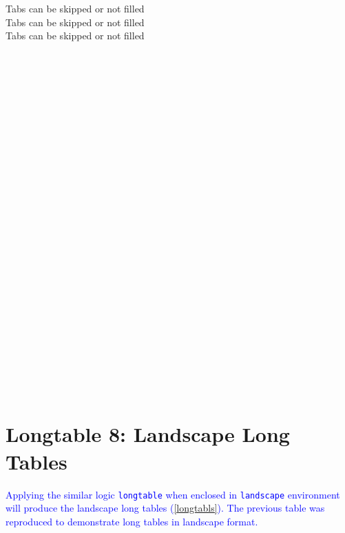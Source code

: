 \documentclass[phd,showgrids]{ndsu-thesis-2022}
\newcommand\italk[1]{\textcolor{blue}{#1}}  %
\begin{document}
\begin{tabbing}
\>Tabs can be skipped or not filled\\ 
\>\>Tabs can be skipped or not filled\\ 
\>\>\>Tabs can be skipped or not filled\\ 
    \\
    \\
    \\
    \\
    \\
    \\
    \\
    \\
    \\
    \\
    \\
    \\
    \\
    \\
    \\
    \\
    \\
    \\
    \\
    \\
    \\
    \\
    \\
    \\
    \\
    \\
\end{tabbing}
\endgroup

\vspace{-4ex}
\kant[9]

\section{Longtable 8: Landscape Long Tables}
\italk{Applying the similar logic \texttt{longtable} when enclosed in \texttt{landscape} environment will produce the landscape long tables (\cref{longtabls}). The previous table was reproduced to demonstrate long tables in landscape format.}
\end{document}
